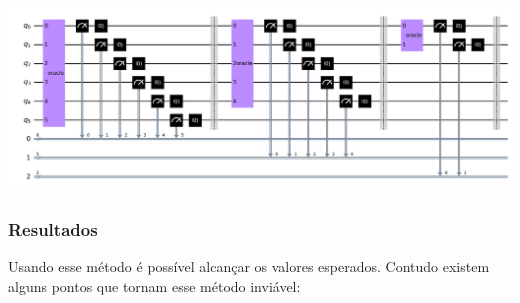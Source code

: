 \documentclass{article}
\begin{document}
\begin{center}
	\includegraphics[scale=0.15]{number_breakdown_circuit.png}
	\label{fig:miles-km-circuit}
\end{center}

\subsubsection{Resultados}

Usando esse método é possível alcançar os valores esperados. Contudo existem alguns pontos que tornam esse método inviável:
\end{document}
